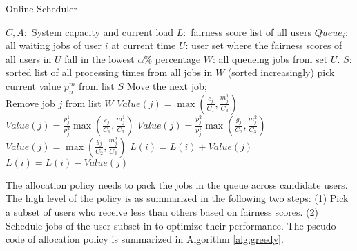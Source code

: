 \begin{algorithm}[H]
\small
\caption{\name Online \name Scheduler}
\label{alg:greedy}
\begin{algorithmic}[1]
    \State $C,A:$ System capacity and current load
    \State $L:$ fairness score list of all users
    \State $Queue_i$: all waiting jobs of user $i$ at current time
    \State $U$: user set where the fairness scores of all users in $U$ fall in the lowest $\alpha$\% percentage
    \State $W$: all queueing jobs from set $U$.
    \State $S$: sorted list of all processing times from all jobs in $W$ (sorted increasingly)
    \State pick current value $p_n^m$ from list $S$		
      
      
      
    \Else
    \State Move the next job;
    \EndIf
    \EndWhile
    \EndProcedure
    \\
      
    \State Remove job $j$ from list $W$
    $Value(j) = \max(\frac{c_j}{C_1},\frac{m_j^1}{C_3})$
    \Else ~
    $Value(j) = \frac{p_j^1}{p_j^2}\max(\frac{c_j}{C_1},\frac{m_j^1}{C_3})$
    \EndIf
    \Else
    $Value(j) = \frac{p_j^2}{p_j^1} \max(\frac{g_j}{C_2},\frac{m_j^2}{C_3})$
    \Else ~
    $Value(j) = \max(\frac{g_j}{C_2},\frac{m_j^2}{C_3})$
    \EndIf
    \EndIf
    \EndIf
    \State $L(i) = L(i) + Value(j)$
    \EndFunction     
    \\
      
    \State $L(i) = L(i) - Value(j)$
    \EndIf
    \EndFunction
\end{algorithmic}
\end{algorithm}

The allocation policy needs to pack the jobs in the queue across candidate users.
The high level of the policy is as summarized in the following two steps:
(1) Pick a subset of users who receive less than others based on fairness scores.
(2) Schedule jobs of the user subset in to optimize their performance.
The pseudo-code of allocation policy is summarized in Algorithm \ref{alg:greedy}.

